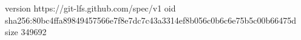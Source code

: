 version https://git-lfs.github.com/spec/v1
oid sha256:80bc4ffa89849457566e7f8e7dc7c43a3314ef8b056c0b6c6e75b5c00b66475d
size 349692
